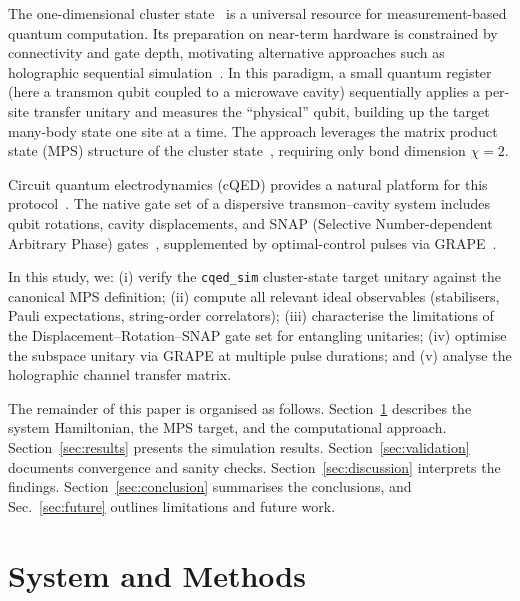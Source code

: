 \documentclass[aps,pra,twocolumn,reprint,floatfix,amsmath,amssymb]{revtex4-2}
\begin{document}
The one-dimensional cluster state~\cite{briegel2001persistent,raussendorf2001one}
is a universal resource for measurement-based quantum computation.
Its preparation on near-term hardware is constrained by connectivity
and gate depth, motivating alternative approaches such as holographic
sequential simulation~\cite{barratt2021parallel,foss2017entanglement}.
In this paradigm, a small quantum register (here a transmon qubit
coupled to a microwave cavity) sequentially applies a per-site
transfer unitary and measures the ``physical'' qubit, building up
the target many-body state one site at a time.  The approach
leverages the matrix product state (MPS) structure of the cluster
state~\cite{perez2007matrix,schollwock2011density}, requiring only
bond dimension $\chi=2$.

Circuit quantum electrodynamics (cQED) provides
a natural platform for this protocol~\cite{blais2021circuit}.
The native gate set of a dispersive transmon--cavity system
includes qubit rotations, cavity displacements, and SNAP
(Selective Number-dependent Arbitrary Phase)
gates~\cite{heeres2017implementing}, supplemented by
optimal-control pulses via GRAPE~\cite{khaneja2005optimal}.

In this study, we: (i) verify the \texttt{cqed\_sim} cluster-state
target unitary against the canonical MPS definition; (ii) compute
all relevant ideal observables (stabilisers, Pauli expectations,
string-order correlators); (iii) characterise the limitations of the
Displacement--Rotation--SNAP gate set for entangling unitaries;
(iv) optimise the subspace unitary via GRAPE at multiple pulse
durations; and (v) analyse the holographic channel transfer matrix.

The remainder of this paper is organised as follows.
Section~\ref{sec:methods} describes the system Hamiltonian, the MPS
target, and the computational approach.  Section~\ref{sec:results}
presents the simulation results.  Section~\ref{sec:validation}
documents convergence and sanity checks.  Section~\ref{sec:discussion}
interprets the findings.  Section~\ref{sec:conclusion} summarises
the conclusions, and Sec.~\ref{sec:future} outlines limitations and
future work.

\section{System and Methods}\label{sec:methods}
\end{document}
